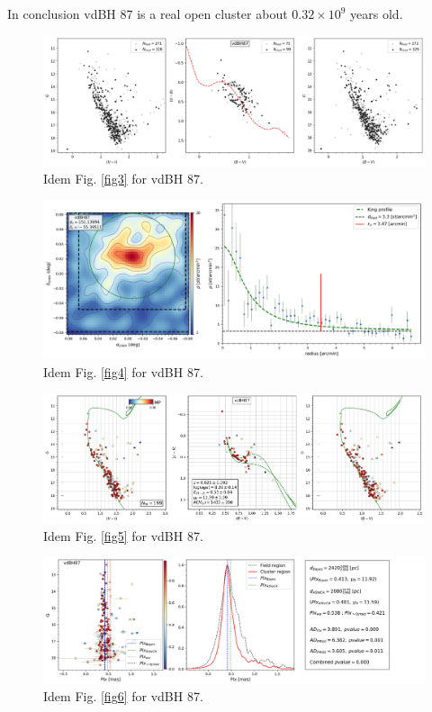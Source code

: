 \documentclass[draft]{aa}
\begin{document}
In conclusion vdBH 87 is a real open cluster about $0.32\times10^9$ years old.

\begin{figure}[ht]
    \centering
    \includegraphics[width=\hsize]{../figs/obs_vdBH87.png}
    \caption{Idem Fig. \ref{fig3} for vdBH 87.}
    \label{fig15}
\end{figure}

\begin{figure}[ht]
    \centering
    \includegraphics[width=\hsize]{../figs/dmap_vdbh87.png}
    \caption{Idem Fig. \ref{fig4} for vdBH 87.}
    \label{fig16}
\end{figure}

\begin{figure}[ht]
    \centering
    \includegraphics[width=\hsize]{../figs/cmds_vdbh87.png}
    \caption{Idem Fig. \ref{fig5} for vdBH 87.}
    \label{fig17}
\end{figure}
\begin{figure}[ht]
    \centering
    \includegraphics[width=\hsize]{../figs/plx_vdBH87.png}
    \caption{Idem Fig. \ref{fig6} for vdBH 87.}
    \label{fig18}
\end{figure}
\end{document}
